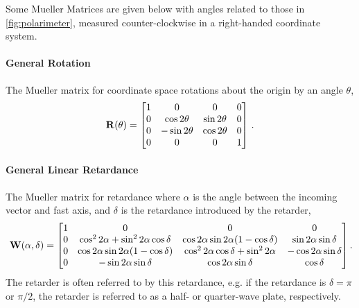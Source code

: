Some Mueller Matrices are given below with angles related to those in \autoref{fig:polarimeter}, measured counter-clockwise in a right-handed coordinate system.

\paragraph{General Rotation}
The Mueller matrix for coordinate space rotations about the origin by an angle $\theta$,
\begin{equation} \label{matrix:rotate}
    \mathbf{R}(\theta) =
    \begin{bmatrix}
        1 & 0              & 0             & 0 \\
        0 & \cos 2 \theta  & \sin 2 \theta & 0 \\
        0 & -\sin 2 \theta & \cos 2 \theta & 0 \\
        0 & 0              & 0             & 1 \\
    \end{bmatrix}\,.
\end{equation}

\paragraph{General Linear Retardance}
The Mueller matrix for retardance where $\alpha$ is the angle between the incoming vector and fast axis, and $\delta$ is the retardance introduced by the retarder,
\begin{equation} \label{matrix:retarder}
    \matr{W}(\alpha, \delta) =
    \begin{bmatrix}
        1 & 0                                                 & 0                                                 & 0                          \\
        0 & \cos^{2} 2 \alpha + \sin^{2} 2 \alpha \cos \delta & \cos 2 \alpha \sin 2 \alpha  (1 - \cos \delta)    & \sin 2 \alpha \sin \delta  \\
        0 & \cos 2 \alpha \sin 2 \alpha  (1 - \cos \delta)    & \cos^{2} 2 \alpha \cos \delta + \sin^{2} 2 \alpha & -\cos 2 \alpha \sin \delta \\
        0 & -\sin 2 \alpha \sin \delta                        & \cos 2 \alpha \sin \delta                         & \cos \delta                \\
    \end{bmatrix}\rlap{.} 
\end{equation}
The retarder is often referred to by this retardance, e.g. if the retardance is $\delta = \pi$ or $\pi / 2$, the retarder is referred to as a half- or quarter-wave plate, respectively.

